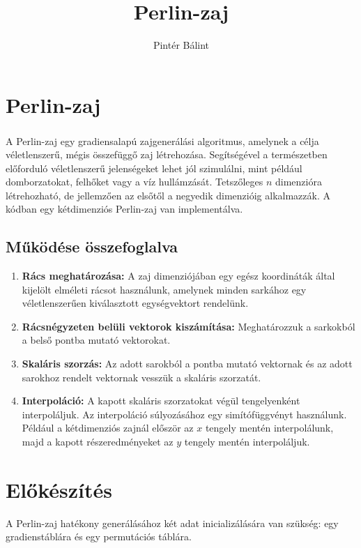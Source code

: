 \documentclass[12pt]{article}
\title{Perlin-zaj}
\author{Pintér Bálint}
\begin{document}
\maketitle
\newpage
\tableofcontents
\newpage

\section{Perlin-zaj}
A Perlin-zaj \textsuperscript{\cite{10.1145/325165.325247}} egy gradiensalapú
zajgenerálási algoritmus, amelynek a célja véletlenszerű, mégis összefüggő zaj
létrehozása. Segítségével a természetben előforduló véletlenszerű jelenségeket
lehet jól szimulálni, mint például domborzatokat, felhőket vagy a víz
hullámzását. Tetszőleges $n$ dimenzióra létrehozható, de jellemzően az elsőtől
a negyedik dimenzióig alkalmazzák. A kódban egy kétdimenziós Perlin-zaj van
implementálva.
\subsection{Működése összefoglalva}
\begin{enumerate}[noitemsep]
    \item \textbf{Rács meghatározása:} A zaj dimenziójában egy egész koordináták által kijelölt elméleti rácsot használunk, amelynek minden sarkához egy véletlenszerűen kiválasztott egységvektort rendelünk.
    \item \textbf{Rácsnégyzeten belüli vektorok kiszámítása:} Meghatározzuk a sarkokból a belső pontba mutató vektorokat.
    \item \textbf{Skaláris szorzás:} Az adott sarokból a pontba mutató vektornak és az adott sarokhoz rendelt vektornak vesszük a skaláris szorzatát.
    \item \textbf{Interpoláció:} A kapott skaláris szorzatokat végül tengelyenként interpoláljuk. Az interpoláció súlyozásához egy simítófüggvényt használunk. Például a kétdimenziós zajnál először az $x$ tengely mentén interpolálunk, majd a kapott részeredményeket az $y$ tengely mentén interpoláljuk.
\end{enumerate}
\section{Előkészítés}
A Perlin-zaj hatékony generálásához két adat inicializálására van szükség: egy
gradienstáblára és egy permutációs táblára. \newpage
\end{document}
